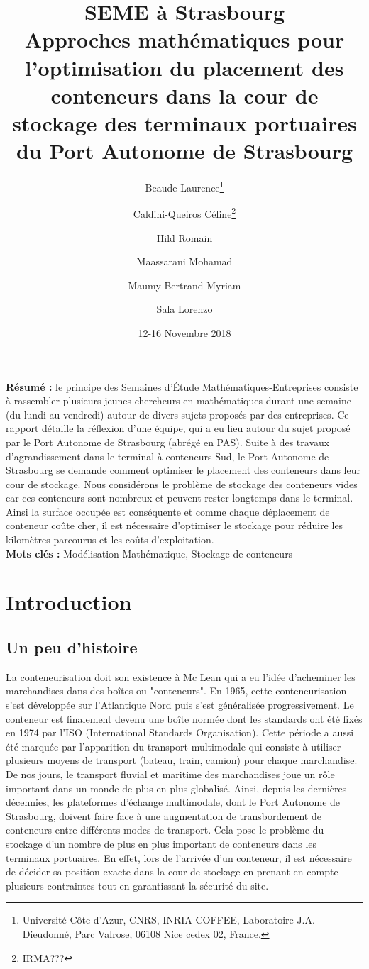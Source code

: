 \documentclass{article}
\title{SEME à Strasbourg\\ 
Approches mathématiques pour l'optimisation du placement des conteneurs dans la cour de stockage des terminaux portuaires du Port Autonome de Strasbourg}
\author{Beaude Laurence\footnote{Universit\'e C\^ote d'Azur, CNRS, INRIA COFFEE, 
	Laboratoire J.A. Dieudonn\'e, 
	Parc Valrose, 06108 Nice cedex 02, France.} 
\and 
Caldini-Queiros Céline\footnote{IRMA???}
\and 
Hild Romain
\and 
Maassarani Mohamad
\and 
Maumy-Bertrand Myriam
\and
Sala Lorenzo
}
\date{12-16 Novembre 2018}
\begin{document}
\maketitle
\noindent
\textbf{Résumé :} le principe des Semaines d'\'Etude Mathématiques-Entreprises consiste à rassembler plusieurs jeunes chercheurs en mathématiques durant une semaine (du lundi au vendredi) autour de divers sujets proposés par des entreprises. 
Ce rapport détaille la réflexion d'une équipe, qui a eu lieu autour du sujet proposé par le Port Autonome de Strasbourg (abrégé en PAS). Suite à des travaux d'agrandissement dans le terminal à conteneurs Sud, le Port Autonome de Strasbourg se demande comment optimiser le placement des conteneurs dans leur cour de stockage. Nous considérons le problème de stockage des conteneurs vides car ces conteneurs sont nombreux et peuvent rester longtemps dans le terminal. Ainsi la surface occupée est conséquente et comme chaque déplacement de conteneur coûte cher, il est nécessaire d'optimiser le stockage pour réduire les kilomètres parcourus et les coûts d'exploitation. \\


\textbf{Mots clés :} Modélisation Mathématique, Stockage de conteneurs

\section{Introduction}

\subsection{Un peu d'histoire}


La conteneurisation doit son existence à Mc Lean qui a eu l'idée d'acheminer les marchandises dans des boîtes ou "conteneurs". En 1965, cette conteneurisation s'est développée sur l’Atlantique Nord puis s'est généralisée progressivement. Le conteneur est finalement devenu une boîte normée dont les standards ont été fixés en 1974 par l’ISO (International Standards Organisation). Cette période a aussi été marquée par l’apparition du transport multimodale qui consiste à utiliser plusieurs moyens de transport (bateau, train, camion) pour chaque marchandise. De nos jours, le transport fluvial et maritime des marchandises joue un rôle important dans un monde de plus en plus globalisé. Ainsi, depuis les dernières décennies, les plateformes d'échange multimodale, dont le Port Autonome de Strasbourg, doivent faire face à une augmentation de transbordement de conteneurs entre différents modes de transport. Cela pose le problème du stockage d'un nombre de plus en plus important de conteneurs dans les terminaux portuaires. En effet, lors de l'arrivée d'un conteneur, il est nécessaire de décider sa position exacte dans la cour de stockage en prenant en compte plusieurs contraintes tout en garantissant la sécurité du site. 
\end{document}
